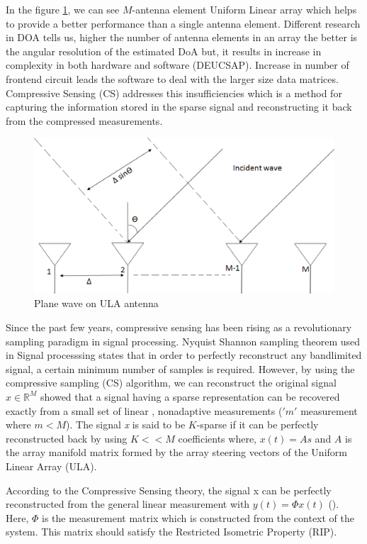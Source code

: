 \documentclass[10pt,conference]{IEEEtran}
\begin{document}
 In the figure \ref{Ula}, we can see $M$-antenna element Uniform Linear array which helps to provide a better performance than a single antenna element. Different research in DOA tells us, higher the number of antenna elements in an array the better is the angular resolution of the estimated DoA but, it results in increase in complexity in both hardware and software (DEUCSAP). Increase in number of frontend circuit leads the software to deal with the larger size data matrices. Compressive Sensing (CS) addresses this insufficiencies which is a method for capturing the information stored in the sparse signal and reconstructing it back from the compressed measurements.
\begin{figure} [!htb]
\centering
\includegraphics[scale=.35]{Ula.eps}
\caption{Plane wave on ULA antenna }
\label{Ula}
\end{figure}

Since the past few years, compressive sensing has been rising as a revolutionary sampling paradigm in signal processing. Nyquist Shannon sampling theorem used in Signal processsing states that in order to perfectly reconstruct any bandlimited signal, a certain minimum number of samples is required. However, by using the compressive sampling (CS) algorithm, we can reconstruct the original signal $ x \in \mathbb{R}^{M} $ showed that a signal having a sparse representation can be recovered exactly from a small set of linear , nonadaptive measurements ($'m'$ measurement where $m < M$). The signal \textit{x} is said to be $K$-sparse if it can be perfectly reconstructed back by using $K<<M$ coefficients where, $x(t)=As$ and $A$ is the array manifold matrix formed by the array steering vectors of the Uniform Linear Array (ULA). 


According to the Compressive Sensing theory, the signal x can be perfectly reconstructed from the general linear measurement with $y(t)= \Phi x(t)$ (). Here, $\Phi$ is the measurement matrix which is constructed from the context of the system. This matrix should satisfy the Restricted Isometric Property (RIP).
\end{document}
